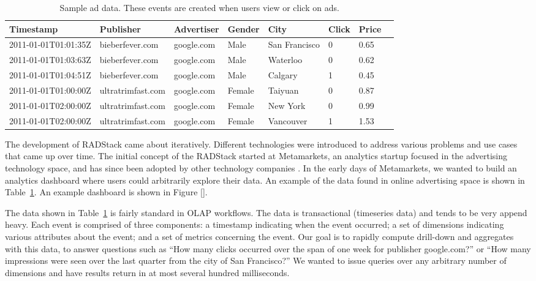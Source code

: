 \documentclass{vldb}
\begin{document}
\begin{table}
  \centering
  \begin{tabular}{| l | l | l | l | l | l | l | l |}
    \hline
    \textbf{Timestamp} & \textbf{Publisher} & \textbf{Advertiser} & \textbf{Gender} & \textbf{City} & \textbf{Click} & \textbf{Price} \\ \hline
    2011-01-01T01:01:35Z & bieberfever.com & google.com & Male & San Francisco & 0 & 0.65 \\ \hline
    2011-01-01T01:03:63Z & bieberfever.com & google.com & Male & Waterloo & 0 & 0.62 \\ \hline
    2011-01-01T01:04:51Z & bieberfever.com & google.com & Male & Calgary & 1 & 0.45 \\ \hline
    2011-01-01T01:00:00Z & ultratrimfast.com & google.com & Female & Taiyuan & 0 & 0.87 \\ \hline
    2011-01-01T02:00:00Z & ultratrimfast.com & google.com & Female & New York & 0 & 0.99 \\ \hline
    2011-01-01T02:00:00Z & ultratrimfast.com & google.com & Female & Vancouver & 1 & 1.53 \\ \hline
  \end{tabular}
  \caption{Sample ad data. These events are created when users view or click on ads.}
  \label{tab:sample_data}
\end{table}

The development of RADStack came about iteratively. Different technologies were
introduced to address various problems and use cases that came up over time.
The initial concept of the RADStack started at Metamarkets, an analytics
startup focused in the advertising technology space, and has since been adopted
by other technology companies \cite{2014yahoo}. In the early days of Metamarkets, we wanted
to build an analytics dashboard where users could arbitrarily explore their
data. An example of the data found in online advertising space is shown in
Table~\ref{tab:sample_data}. An example dashboard is shown in Figure [].
 
The data shown in Table~\ref{tab:sample_data} is fairly standard in OLAP
workflows. The data is transactional (timeseries data) and tends to be very
append heavy. Each event is comprised of three components: a timestamp
indicating when the event occurred; a set of dimensions indicating various
attributes about the event; and a set of metrics concerning the event. Our goal
is to rapidly compute drill-down and aggregates with this data, to answer
questions such as “How many clicks occurred over the span of one week for
publisher google.com?” or “How many impressions were seen over the last quarter
from the city of San Francisco?” We wanted to issue queries over any arbitrary
number of dimensions and have results return in at most several hundred
milliseconds.
 
\end{document}
